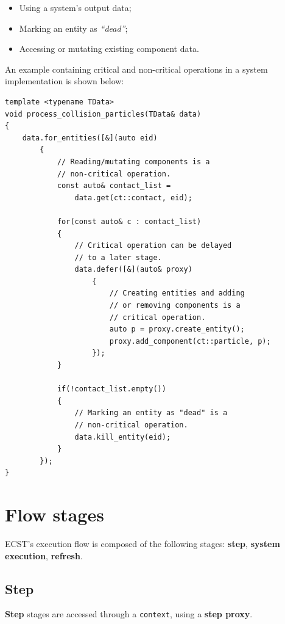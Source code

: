 \documentclass[oneside, 12pt, a4paper, openany]{book}
\begin{document}
\begin{itemize}
\item
  Using a system's output data;
\item
  Marking an entity as \emph{``dead''};
\item
  Accessing or mutating existing component data.
\end{itemize}

An example containing critical and non-critical operations in a system
implementation is shown below:

\begin{verbatim}
template <typename TData>
void process_collision_particles(TData& data)
{
    data.for_entities([&](auto eid)
        {
            // Reading/mutating components is a
            // non-critical operation.
            const auto& contact_list =
                data.get(ct::contact, eid);

            for(const auto& c : contact_list)
            {
                // Critical operation can be delayed
                // to a later stage.
                data.defer([&](auto& proxy)
                    {
                        // Creating entities and adding
                        // or removing components is a
                        // critical operation.
                        auto p = proxy.create_entity();
                        proxy.add_component(ct::particle, p);
                    });
            }

            if(!contact_list.empty())
            {
                // Marking an entity as "dead" is a
                // non-critical operation.
                data.kill_entity(eid);
            }
        });
}
\end{verbatim}

\section{Flow stages}\label{flow-stages}

ECST's execution flow is composed of the following stages:
\textbf{step}, \textbf{system execution}, \textbf{refresh}.

\hypertarget{step_stage}{\subsection{Step}\label{step_stage}}

\textbf{Step} stages are accessed through a
\texttt{context},
using a \textbf{step proxy}.
\end{document}
